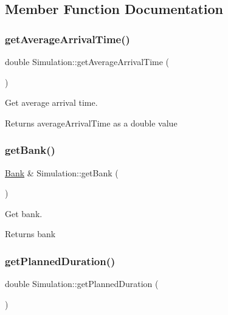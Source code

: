 \subsection{Member Function Documentation}
\mbox{\label{classSimulation_a1e4f97c6011a0cbce91c5034c917ab46}} 
\subsubsection{\texorpdfstring{get\+Average\+Arrival\+Time()}{getAverageArrivalTime()}}
{\footnotesize\ttfamily double Simulation\+::get\+Average\+Arrival\+Time (\begin{DoxyParamCaption}{ }\end{DoxyParamCaption})}

Get average arrival time. \begin{DoxyReturn}{Returns}
average\+Arrival\+Time as a double value 
\end{DoxyReturn}
\mbox{\label{classSimulation_a280ef124f9f6395a446b36a9dd45e4bc}} 
\subsubsection{\texorpdfstring{get\+Bank()}{getBank()}}
{\footnotesize\ttfamily \hyperlink{classBank}{Bank} \& Simulation\+::get\+Bank (\begin{DoxyParamCaption}{ }\end{DoxyParamCaption})}

Get bank. \begin{DoxyReturn}{Returns}
bank 
\end{DoxyReturn}
\mbox{\label{classSimulation_a242c58ccefca3705bdc47ee7827c24fe}} 
\subsubsection{\texorpdfstring{get\+Planned\+Duration()}{getPlannedDuration()}}
{\footnotesize\ttfamily double Simulation\+::get\+Planned\+Duration (\begin{DoxyParamCaption}{ }\end{DoxyParamCaption})}

